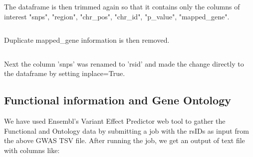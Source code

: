 \documentclass[12pt,a4paper]{article}
\newcommand{\subsect}[1]{
\hypertarget{#1}{
\subsection{#1}\label{#1}}
}
\begin{document}
\inputminted{python}{code_snippets/placeholder.py}
The dataframe is then trimmed again so that it contains only the columns of interest   "snps", "region", "chr\_pos", "chr\_id", "p\_value", "mapped\_gene".

\inputminted{python}{code_snippets/placeholder.py}
Duplicate mapped\_gene information is then removed.

\inputminted{python}{code_snippets/placeholder.py}
Next the column 'snps' was renamed to 'rsid' and made the change directly to the dataframe by setting inplace=True.


\subsect{Functional information and Gene Ontology}

We have used Ensembl's Variant Effect Predictor web tool to gather the Functional and Ontology data by
submitting a job with the rsIDs as input from the above GWAS TSV file.
After running the job, we get an output of text file with columns like:
\end{document}
